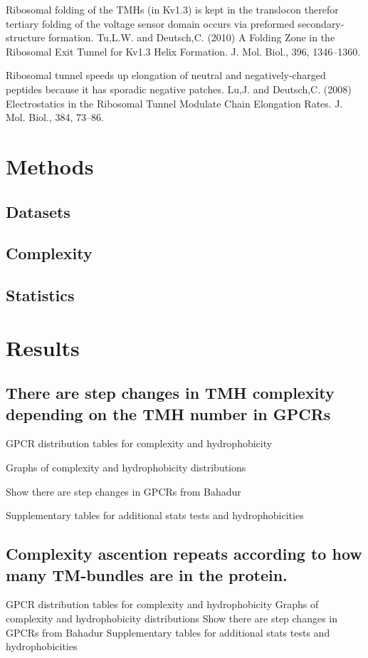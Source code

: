 Ribosomal folding of the TMHs (in Kv1.3) is kept in the translocon therefor tertiary folding of the voltage sensor domain occurs via preformed secondary-structure formation. Tu,L.W. and Deutsch,C. (2010) A Folding Zone in the Ribosomal Exit Tunnel for Kv1.3 Helix Formation. J. Mol. Biol., 396, 1346–1360.

Ribosomal tunnel speeds up elongation of neutral and negatively-charged peptides because it has sporadic negative patches. Lu,J. and Deutsch,C. (2008) Electrostatics in the Ribosomal Tunnel Modulate Chain Elongation Rates. J. Mol. Biol., 384, 73–86.

\section{Methods}
\subsection{Datasets}
\subsection{Complexity}
\subsection{Statistics}

\section{Results}
\subsection{There are step changes in TMH complexity depending on the TMH number in GPCRs}
GPCR distribution tables for complexity and hydrophobicity

Graphs of complexity and hydrophobicity distributions

Show there are step changes in GPCRs from Bahadur

Supplementary tables for additional stats tests and hydrophobicities

\subsection{Complexity ascention repeats according to how many TM-bundles are in the protein.}
GPCR distribution tables for complexity and hydrophobicity
Graphs of complexity and hydrophobicity distributions
Show there are step changes in GPCRs from Bahadur
Supplementary tables for additional stats tests and hydrophobicities

